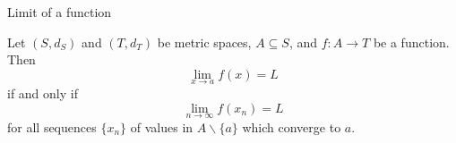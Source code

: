 \documentclass{beamer}
\begin{document}
\begin{frame}{Limit of a function}
\begin{thm}
\pause
Let $(S,d_S)$ and $(T,d_T)$ be metric spaces, $A\subseteq S$, and $f: A\rightarrow T$ be a function.
\pause
Then
$$\lim_{x\rightarrow a} f(x) = L$$
\pause
if and only if
$$\lim_{n\rightarrow \infty} f(x_n) = L$$
for all sequences $\{x_n\}$ of values in $A\backslash \{a\}$ which converge to $a$.
\end{thm}
\end{frame}
\end{document}
